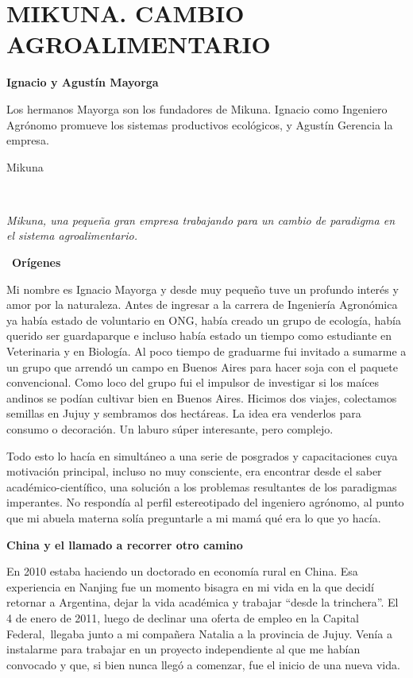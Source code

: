 \hypertarget{mikuna}{\chapter{MIKUNA. CAMBIO AGROALIMENTARIO}\label{mikuna}}


\textbf{Ignacio y Agustín Mayorga}

Los hermanos Mayorga son los fundadores de Mikuna. Ignacio como
Ingeniero Agrónomo promueve los sistemas productivos ecológicos, y
Agustín Gerencia la empresa.

Mikuna

~

\emph{Mikuna, una pequeña gran empresa trabajando para un cambio de paradigma en el sistema agroalimentario.}

~\textbf{Orígenes}

Mi nombre es Ignacio Mayorga y desde muy pequeño tuve un profundo
interés y amor por la naturaleza. Antes de ingresar a la carrera de
Ingeniería Agronómica ya había estado de voluntario en ONG, había creado
un grupo de ecología, había querido ser guardaparque e incluso había
estado un tiempo como estudiante en Veterinaria y en Biología. Al poco
tiempo de graduarme fui invitado a sumarme a un grupo que arrendó un
campo en Buenos Aires para hacer soja con el paquete convencional. Como
loco del grupo fui el impulsor de investigar si los maíces andinos se
podían cultivar bien en Buenos Aires. Hicimos dos viajes, colectamos
semillas en Jujuy y sembramos dos hectáreas. La idea era venderlos para
consumo o decoración. Un laburo súper interesante, pero complejo.

Todo esto lo hacía en simultáneo a una serie de posgrados y
capacitaciones cuya motivación principal, incluso no muy consciente, era
encontrar desde el saber académico-científico, una solución a los
problemas resultantes de los paradigmas imperantes. No respondía al
perfil estereotipado del ingeniero agrónomo, al punto que mi abuela
materna solía preguntarle a mi mamá qué era lo que yo hacía.

\textbf{China y el llamado a recorrer otro camino}

En 2010 estaba haciendo un doctorado en economía rural en China. Esa
experiencia en Nanjing fue un momento bisagra en mi vida en la que
decidí retornar a Argentina, dejar la vida académica y trabajar ``desde
la trinchera''. El 4 de enero de 2011, luego de declinar una oferta de
empleo en la Capital Federal,~llegaba junto a mi compañera Natalia a la
provincia de Jujuy. Venía a instalarme para trabajar en un proyecto
independiente al que me habían convocado y que, si bien nunca llegó a
comenzar, fue el inicio de una nueva vida.

